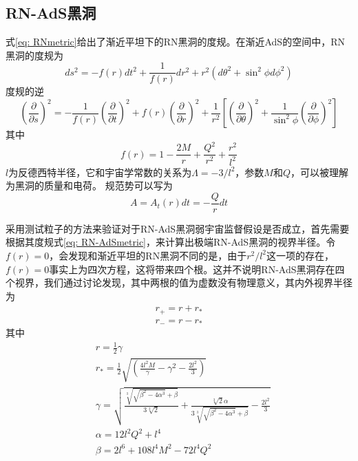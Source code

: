 \subsection{RN-AdS黑洞}
式\eqref{eq: RNmetric}给出了渐近平坦下的RN黑洞的度规。在渐近AdS的空间中，RN黑洞的度规为
\begin{equation}\label{eq: RN-AdSmetric}
    ds^2=-f\left(r\right)dt^2+\frac{1}{f\left(r\right)}dr^2+r^2\left(d\theta^2+\sin^2\phi d\phi ^2\right)
\end{equation}
度规的逆
\begin{equation}\label{eq: RN-AdSinversmetric}
    \left(\frac{\partial }{\partial s}\right)^2=-\frac{1}{f\left(r\right)}\left(\frac{\partial }{\partial t}\right)^2+f\left(r\right)\left(\frac{\partial }{\partial r}\right)^2+\frac{1}{r^2}\left[\left(\frac{\partial }{\partial \theta}\right)^2+\frac{1}{\sin ^2 \phi}\left(\frac{\partial }{\partial \phi}\right)^2\right]
\end{equation}
其中
\begin{equation}\label{eq: f(r)}
    f\left(r\right)=1-\frac{2M}{r}+\frac{Q^2}{r^2}+\frac{r^2}{l^2}
\end{equation}
$l$为反德西特半径，它和宇宙学常数的关系为$\Lambda=-3/l^2$，参数$M$和$Q$，可以被理解为黑洞的质量和电荷。
规范势可以写为
\begin{equation}\label{eq: vectorpotion}
    A=A_t\left(r\right)dt=-\frac{Q}{r}dt
\end{equation}

采用测试粒子的方法来验证对于RN-AdS黑洞弱宇宙监督假设是否成立，首先需要根据其度规式\eqref{eq: RN-AdSmetric}，来计算出极端RN-AdS黑洞的视界半径。令$ f(r)=0 $，会发现和渐近平坦的RN黑洞不同的是，由于$r^2/l^2$这一项的存在，$ f(r)=0 $事实上为四次方程，这将带来四个根。这并不说明RN-AdS黑洞存在四个视界，我们通过讨论发现，其中两根的值为虚数没有物理意义，其内外视界半径为
\begin{align}
    r_+=r + r_* \label{eq: rnr+} \\
    r_-=r-r_* \label{eq: rnr-} 
\end{align}
其中
\begin{align*}
    &r = \frac{1}{2} \gamma \\
    &r_* = \frac{1}{2} \sqrt{(\frac{4 l^2
    M}{\gamma}-\gamma^2-\frac{2 l^2}{3})}  \\
    &\gamma = \sqrt{\frac{\sqrt[3]{\sqrt{\beta^2-4 \alpha^3}+\beta}}{3\sqrt[3]{2}}+\frac{\sqrt[3]{2} \alpha}{3 \sqrt[3]{\sqrt{\beta^2-4\alpha^3}+\beta}}-\frac{2 l^2}{3}} \\
    &\alpha =12 l^2 Q^2+l^4 \\ 
    &\beta =2 l^6 + 108 l^4 M^2 - 72 l^4 Q^2 
\end{align*}

